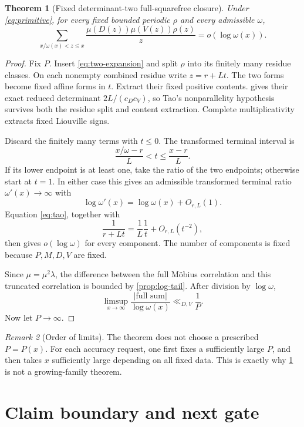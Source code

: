 \documentclass[11pt]{article}
\newtheorem{theorem}{Theorem}[section]
\theoremstyle{definition}
\theoremstyle{remark}
\newtheorem{remark}[theorem]{Remark}
\begin{document}
\begin{theorem}[Fixed determinant-two full-squarefree closure]
\label{thm:main}
Under \eqref{eq:primitive}, for every fixed bounded periodic
\(\rho\) and every admissible \(\omega\),
\begin{equation}
\boxed{
 \sum_{x/\omega(x)<z\le x}
 \frac{\mu(D(z))\mu(V(z))\rho(z)}{z}
 =
 o(\log\omega(x)).}
\label{eq:main}
\end{equation}
\end{theorem}

\begin{proof}
Fix \(P\).  Insert \eqref{eq:two-expansion} and split \(\rho\) into
its finitely many residue classes.  On each nonempty combined
residue write \(z=r+Lt\).  The two forms become fixed affine forms
in \(t\).  Extract their fixed positive contents.
 gives their exact reduced
determinant \(2L/(c_Dc_V)\), so Tao's nonparallelity hypothesis
survives both the residue split and content extraction.  Complete
multiplicativity extracts fixed Liouville signs.

Discard the finitely many terms with \(t\le0\).  The transformed
terminal interval is
\[
 \frac{x/\omega-r}{L}<t\le\frac{x-r}{L}.
\]
If its lower endpoint is at least one, take the ratio of the two
endpoints; otherwise start at \(t=1\).  In either case this gives
an admissible transformed terminal ratio \(\omega'(x)\to\infty\)
with
\[
 \log\omega'(x)=\log\omega(x)+O_{r,L}(1).
\]
Equation \eqref{eq:tao}, together with
\[
 \frac1{r+Lt}=\frac1L\frac1t+O_{r,L}(t^{-2}),
\]
then gives \(o(\log\omega)\) for every component.  The number of
components is fixed because \(P,M,D,V\) are fixed.

Since \(\mu=\mu^2\lambda\), the difference between the full
M\"obius correlation and this truncated correlation is bounded by
\cref{prop:log-tail}.  After division by \(\log\omega\),
\[
 \limsup_{x\to\infty}
 \frac{|\text{full sum}|}{\log\omega(x)}
 \ll_{D,V}\frac1P.
\]
Now let \(P\to\infty\).
\end{proof}

\begin{remark}[Order of limits]
The theorem does not choose a prescribed \(P=P(x)\).  For each
accuracy request, one first fixes a sufficiently large \(P\), and
then takes \(x\) sufficiently large depending on all fixed data.
This is exactly why \cref{thm:main} is not a growing-family theorem.
\end{remark}

\section{Claim boundary and next gate}
\end{document}
